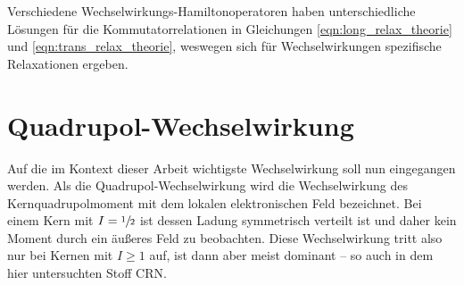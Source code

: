 Verschiedene Wechselwirkungs-Hamiltonoperatoren haben unterschiedliche Lösungen für die Kommutatorrelationen in Gleichungen \eqref{eqn:long_relax_theorie} und \eqref{eqn:trans_relax_theorie}, weswegen sich für Wechselwirkungen spezifische Relaxationen ergeben.





\section{Quadrupol-Wechselwirkung} \label{section:theo:qww}

Auf die im Kontext dieser Arbeit wichtigste Wechselwirkung soll nun eingegangen werden. Als die Quadrupol-Wechselwirkung wird die Wechselwirkung des Kernquadrupolmoment mit dem lokalen elektronischen Feld bezeichnet. Bei einem Kern mit $I = \sfrac{1}{2}$ ist dessen Ladung symmetrisch verteilt ist und daher kein Moment durch ein äußeres Feld zu beobachten. Diese Wechselwirkung tritt also nur bei Kernen mit $I \ge 1$ auf, ist dann aber meist dominant -- so auch in dem hier untersuchten Stoff CRN.

